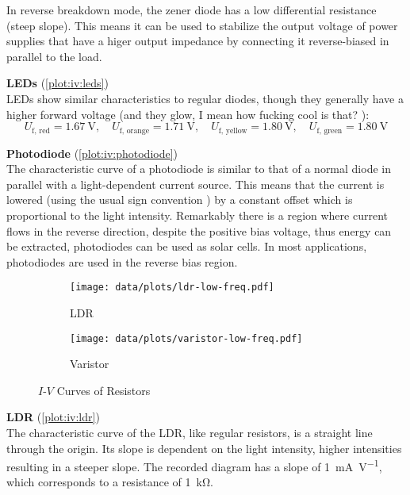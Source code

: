 In reverse breakdown mode, the zener diode has a low differential resistance (steep slope).
This means it can be used to stabilize the output voltage of power supplies that have a higer output impedance by connecting it reverse-biased in parallel to the load.

\textbf{LEDs} (\autoref{plot:iv:leds})\\
LEDs show similar characteristics to regular diodes, though they generally have a higher forward voltage (and they glow, I mean how fucking cool is that? ):
\begin{equation*}
	U_\text{f, red} = \SI{1.67}{\volt}, \quad U_\text{f, orange} = \SI{1.71}{\volt}, \quad U_\text{f, yellow} = \SI{1.80}{\volt}, \quad U_\text{f, green} = \SI{1.80}{\volt}
\end{equation*}

\textbf{Photodiode} (\autoref{plot:iv:photodiode})\\
The characteristic curve of a photodiode is similar to that of a normal diode in parallel with a light-dependent current source.
This means that the current is lowered (using the usual sign convention ) by a constant offset which is proportional to the light intensity.
Remarkably there is a region where current flows in the reverse direction, despite the positive bias voltage, thus energy can be extracted, photodiodes can be used as solar cells.
In most applications, photodiodes are used in the reverse bias region.

\begin{figure}[tbp]
	\centering

	\begin{subfigure}{\ivsubfigwidth}
		\centering
		\texttt{[image: data/plots/ldr-low-freq.pdf]}
		\caption{LDR}
		\label{plot:iv:ldr}
	\end{subfigure}
	\begin{subfigure}{\ivsubfigwidth}
		\centering
		\texttt{[image: data/plots/varistor-low-freq.pdf]}
		\caption{Varistor}
		\label{plot:iv:varistor}
	\end{subfigure}

	\caption{$I$-$V$ Curves of Resistors}	%
	\label{plot:iv:boring}
\end{figure}

\textbf{LDR} (\autoref{plot:iv:ldr})\\
The characteristic curve of the LDR, like regular resistors, is a straight line through the origin.
Its slope is dependent on the light intensity, higher intensities resulting in a steeper slope.
The recorded diagram has a slope of \SI{1}{\mA\per\volt}, which corresponds to a resistance of \SI{1}{\kilo\ohm}.

